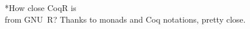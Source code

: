 \documentclass{beamer}
\begin{document}
\sectionframe**{How close CoqR is\\from GNU~R?}{
    \vfill
    \centering{}
    \textcolor{DarkPlum}{Thanks to monads and Coq notations, pretty close.}
}

%
%
%
%
%
\end{document}
